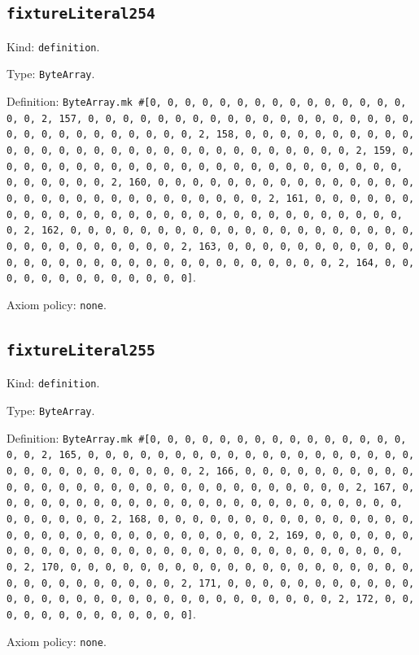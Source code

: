 \documentclass[11pt]{article}
\begin{document}
\subsection*{\texttt{fixtureLiteral254}}
\noindent Kind: \texttt{definition}.\par
\noindent Type: \texttt{ByteArray}.\par
\noindent Definition: \texttt{ByteArray.mk \#[0, 0, 0, 0, 0, 0, 0, 0, 0, 0, 0, 0, 0, 0, 0, 0, 0, 2, 157, 0, 0, 0, 0, 0, 0, 0, 0, 0, 0, 0, 0, 0, 0, 0, 0, 0, 0, 0, 0, 0, 0, 0, 0, 0, 0, 0, 0, 0, 0, 2, 158, 0, 0, 0, 0, 0, 0, 0, 0, 0, 0, 0, 0, 0, 0, 0, 0, 0, 0, 0, 0, 0, 0, 0, 0, 0, 0, 0, 0, 0, 0, 2, 159, 0, 0, 0, 0, 0, 0, 0, 0, 0, 0, 0, 0, 0, 0, 0, 0, 0, 0, 0, 0, 0, 0, 0, 0, 0, 0, 0, 0, 0, 0, 2, 160, 0, 0, 0, 0, 0, 0, 0, 0, 0, 0, 0, 0, 0, 0, 0, 0, 0, 0, 0, 0, 0, 0, 0, 0, 0, 0, 0, 0, 0, 0, 2, 161, 0, 0, 0, 0, 0, 0, 0, 0, 0, 0, 0, 0, 0, 0, 0, 0, 0, 0, 0, 0, 0, 0, 0, 0, 0, 0, 0, 0, 0, 0, 2, 162, 0, 0, 0, 0, 0, 0, 0, 0, 0, 0, 0, 0, 0, 0, 0, 0, 0, 0, 0, 0, 0, 0, 0, 0, 0, 0, 0, 0, 0, 0, 2, 163, 0, 0, 0, 0, 0, 0, 0, 0, 0, 0, 0, 0, 0, 0, 0, 0, 0, 0, 0, 0, 0, 0, 0, 0, 0, 0, 0, 0, 0, 0, 2, 164, 0, 0, 0, 0, 0, 0, 0, 0, 0, 0, 0, 0, 0]}.\par
\noindent Axiom policy: \texttt{none}.\par
\subsection*{\texttt{fixtureLiteral255}}
\noindent Kind: \texttt{definition}.\par
\noindent Type: \texttt{ByteArray}.\par
\noindent Definition: \texttt{ByteArray.mk \#[0, 0, 0, 0, 0, 0, 0, 0, 0, 0, 0, 0, 0, 0, 0, 0, 0, 2, 165, 0, 0, 0, 0, 0, 0, 0, 0, 0, 0, 0, 0, 0, 0, 0, 0, 0, 0, 0, 0, 0, 0, 0, 0, 0, 0, 0, 0, 0, 0, 2, 166, 0, 0, 0, 0, 0, 0, 0, 0, 0, 0, 0, 0, 0, 0, 0, 0, 0, 0, 0, 0, 0, 0, 0, 0, 0, 0, 0, 0, 0, 0, 2, 167, 0, 0, 0, 0, 0, 0, 0, 0, 0, 0, 0, 0, 0, 0, 0, 0, 0, 0, 0, 0, 0, 0, 0, 0, 0, 0, 0, 0, 0, 0, 2, 168, 0, 0, 0, 0, 0, 0, 0, 0, 0, 0, 0, 0, 0, 0, 0, 0, 0, 0, 0, 0, 0, 0, 0, 0, 0, 0, 0, 0, 0, 0, 2, 169, 0, 0, 0, 0, 0, 0, 0, 0, 0, 0, 0, 0, 0, 0, 0, 0, 0, 0, 0, 0, 0, 0, 0, 0, 0, 0, 0, 0, 0, 0, 2, 170, 0, 0, 0, 0, 0, 0, 0, 0, 0, 0, 0, 0, 0, 0, 0, 0, 0, 0, 0, 0, 0, 0, 0, 0, 0, 0, 0, 0, 0, 0, 2, 171, 0, 0, 0, 0, 0, 0, 0, 0, 0, 0, 0, 0, 0, 0, 0, 0, 0, 0, 0, 0, 0, 0, 0, 0, 0, 0, 0, 0, 0, 0, 2, 172, 0, 0, 0, 0, 0, 0, 0, 0, 0, 0, 0, 0, 0]}.\par
\noindent Axiom policy: \texttt{none}.\par
\end{document}
